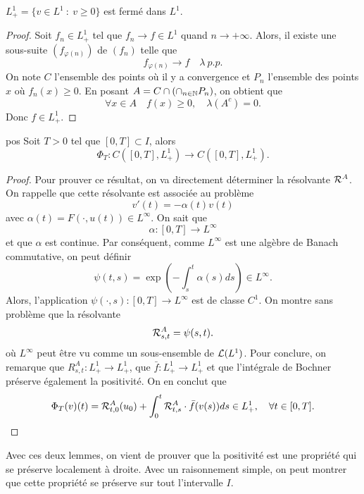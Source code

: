 \begin{lem}{}{}
	$L^1_+ = \{v \in L^1 \ : \ v \ge 0\}$ est fermé dans $L^1$.
\end{lem}

\begin{proof}
	Soit $f_n \in L^1_+$ tel que $f_n \to f \in L^1$ quand $n \to +\infty$. Alors, il existe une sous-suite $(f_{\varphi(n)})$ de $(f_n)$ telle que
	\[
		f_{\varphi(n)} \to f \quad \lambda \ p.p.
	\]
	On note $C$ l'ensemble des points où il y a convergence et $P_n$ l'ensemble des points $x$ où $f_n(x) \ge 0$. En posant
	$A = C \cap \left(\cap_{n \in \mathbb{N}}P_n \right)$,
	on obtient que
	\[
		\forall x \in A \quad f(x) \ge 0, \quad \lambda(A^c) = 0.
	\]
	Donc $f \in L^1_+$.
\end{proof}

\begin{lem}{}{pos}
	Soit $T > 0$ tel que $[0,T] \subset I$, alors
	\[
		\Phi_T : C([0,T], L^1_+) \to C([0,T], L^1_+).
	\]
\end{lem}

\begin{proof}
	Pour prouver ce résultat, on va directement déterminer la résolvante $\mathcal{R}^A$. On rappelle que cette résolvante est associée au problème
	\begin{equation}
		v'(t) = - \alpha(t) v(t)
		\label{eq:ev_fin}
	\end{equation}
	avec $\alpha(t) = F(\cdot, u(t)) \in L^{\infty}$. On sait que
	\[
		\alpha : [0,T] \to L^\infty
	\]
	et que $\alpha$ est continue. Par conséquent, comme $L^\infty$ est une algèbre de Banach commutative, on peut définir
	\[
		\psi(t,s) = \exp\left(-\int_s^t \alpha(s) ds \right) \in L^\infty.
	\]
	Alors, l'application $\psi(\cdot , s) : [0,T] \to L^\infty$ est de classe $C^1$.
	On montre sans problème que la résolvante
	\[
		\mathcal{R}^A_{s,t} = \psi(s,t).
	\]
	où $L^\infty$ peut être vu comme un sous-ensemble de $\mathcal{L}(L^1)$.
	Pour conclure, on remarque que $R_{s,t}^A : L^1_+ \to L^1_+$, que $\bar f : L^1_+ \to L^1_+$ et que
	l'intégrale de Bochner préserve également la positivité. On en conclut que
	\[
		\Phi_T(v)(t) = \mathcal{R}^A_{t,0}(u_0) + \int_{0}^t \mathcal{R}^A_{t,s} \cdot \bar f (v(s)) ds \in L^1_+, \quad \forall t \in [0,T].
	\]
\end{proof}

Avec ces deux lemmes, on vient de prouver que la positivité est une propriété qui se préserve localement à droite.
Avec un raisonnement simple, on peut montrer que cette propriété se préserve sur tout l'intervalle $I$.

